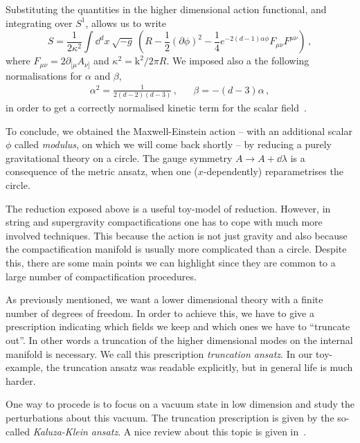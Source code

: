 \documentclass[draft]{phd}
\begin{document}
			Substituting the quantities in the higher dimensional action functional, and integrating over $S^1$, allows us to write
					\begin{equation*}
						S = \frac{1}{2 \kappa^2} \int \dd^{d}x\ \sqrt{-g}\ \left(R - \frac{1}{2} (\partial \phi)^2 - \frac{1}{4} e^{-2(d-1) \alpha \phi} F_{\mu\nu}F^{\mu\nu} \right)\, ,
					\end{equation*}
			where $F_{\mu\nu} = 2 \partial_{[\mu} A_{\nu]}$ and $\kappa^2 = \mathrm{k}^2/ 2\pi R$.
			We imposed also a the following normalisations for $\alpha$ and $\beta$,
					\begin{align*}
						&& \alpha^2  = \frac{1}{2(d-2)(d-3)} \, , & & \beta = - (d-3) \alpha \, ,& &
					\end{align*}
			in order to get a correctly normalised kinetic term for the scalar field~\cite{popeKK}.
			
			To conclude, we obtained the Maxwell-Einstein action -- with an additional scalar $\phi$ called \emph{modulus}, on which we will come back shortly -- by reducing a purely gravitational theory on a circle.
			The gauge symmetry $A \rightarrow A + \dd \lambda$ is a consequence of the metric ansatz, when one ($x$-dependently) reparametrises the circle.
			
			The reduction exposed above is a useful toy-model of reduction.
			However, in string and supergravity compactifications one has to cope with much more involved techniques.
			This because the action is not just gravity and also because the compactification manifold is usually more complicated than a circle.
			Despite this, there are some main points we can highlight since they are common to a large number of compactification procedures.
			
			As previously mentioned, we want a lower dimensional theory with a finite number of degrees of freedom.
			In order to achieve this, we have to give a prescription indicating which fields we keep and which ones we have to ``truncate out''.
			In other words a truncation of the higher dimensional modes on the internal manifold is necessary.
			We call this prescription \emph{truncation ansatz}.
			In our toy-example, the truncation ansatz was readable explicitly, but in general life is much harder.
			
			One way to procede is to focus on a vacuum state in low dimension and study the perturbations about this vacuum.
			The truncation prescription is given by the so-called \emph{Kaluza-Klein ansatz}.
			A nice review about this topic is given in~\cite{duffKK}.
			
\end{document}
